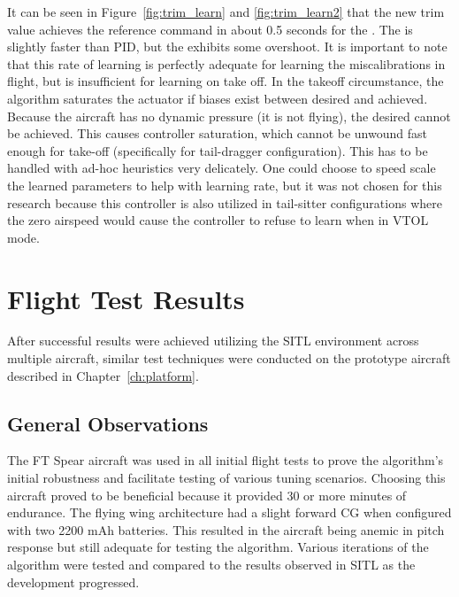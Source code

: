 It can be seen in Figure~\ref{fig:trim_learn} and \ref{fig:trim_learn2} that the new trim value achieves the reference command in about 0.5 seconds for the \Lone.  The \Lone is slightly faster than \ac{PID}, but the \Lone exhibits some overshoot.  It is important to note that this rate of learning is perfectly adequate for learning the miscalibrations in flight, but is insufficient for learning on take off.  In the takeoff circumstance, the algorithm saturates the actuator if biases exist between desired and achieved.  Because the aircraft has no dynamic pressure (it is not flying), the desired cannot be achieved.  This causes controller saturation, which cannot be unwound fast enough for take-off (specifically for tail-dragger configuration).  This has to be handled with ad-hoc heuristics very delicately.  One could choose to speed scale the learned parameters to help with learning rate, but it was not chosen for this research because this controller is also utilized in tail-sitter configurations where the zero airspeed would cause the controller to refuse to learn when in \ac{VTOL} mode.

\section{Flight Test Results}\label{sec:flight_test}
After successful results were achieved utilizing the \ac{SITL} environment across multiple aircraft, similar test techniques were conducted on the prototype aircraft described in Chapter~\ref{ch:platform}.
\subsection{General Observations}
The FT Spear aircraft was used in all initial flight tests to prove the algorithm's initial robustness and facilitate testing of various tuning scenarios.  Choosing this aircraft proved to be beneficial because it provided 30 or more minutes of endurance.  The flying wing architecture had a slight forward \ac{CG} when configured with two 2200 \ac{mAh} batteries.  This resulted in the aircraft being anemic in pitch response but still adequate for testing the \Lone algorithm.  Various iterations of the algorithm were tested and compared to the results observed in \ac{SITL} as the development progressed.  

